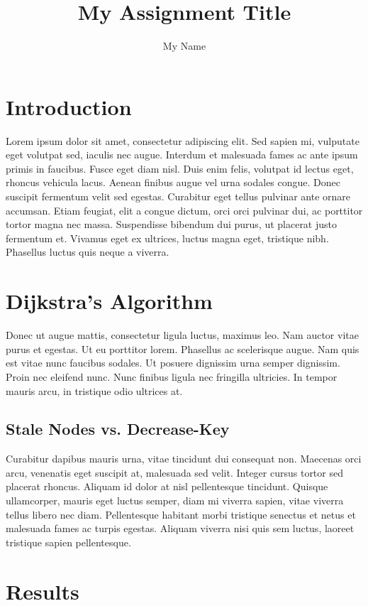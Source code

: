 \documentclass[11pt,twocolumn]{article} %
\title{My Assignment Title}
\author{My Name}
\begin{document}
\maketitle

\section{Introduction}

Lorem ipsum dolor sit amet, consectetur adipiscing elit. Sed sapien mi, vulputate eget volutpat sed, iaculis nec augue. Interdum et malesuada fames ac ante ipsum primis in faucibus. Fusce eget diam nisl. Duis enim felis, volutpat id lectus eget, rhoncus vehicula lacus. Aenean finibus augue vel urna sodales congue. Donec suscipit fermentum velit sed egestas. Curabitur eget tellus pulvinar ante ornare accumsan. Etiam feugiat, elit a congue dictum, orci orci pulvinar dui, ac porttitor tortor magna nec massa. Suspendisse bibendum dui purus, ut placerat justo fermentum et. Vivamus eget ex ultrices, luctus magna eget, tristique nibh. Phasellus luctus quis neque a viverra.

\section{Dijkstra's Algorithm}

Donec ut augue mattis, consectetur ligula luctus, maximus leo. Nam auctor vitae purus et egestas. Ut eu porttitor lorem. Phasellus ac scelerisque augue. Nam quis est vitae nunc faucibus sodales. Ut posuere dignissim urna semper dignissim. Proin nec eleifend nunc. Nunc finibus ligula nec fringilla ultricies. In tempor mauris arcu, in tristique odio ultrices at.

\subsection{Stale Nodes vs. Decrease-Key}

Curabitur dapibus mauris urna, vitae tincidunt dui consequat non. Maecenas orci arcu, venenatis eget suscipit at, malesuada sed velit. Integer cursus tortor sed placerat rhoncus. Aliquam id dolor at nisl pellentesque tincidunt. Quisque ullamcorper, mauris eget luctus semper, diam mi viverra sapien, vitae viverra tellus libero nec diam. Pellentesque habitant morbi tristique senectus et netus et malesuada fames ac turpis egestas. Aliquam viverra nisi quis sem luctus, laoreet tristique sapien pellentesque.

\section{Results}
\end{document}
